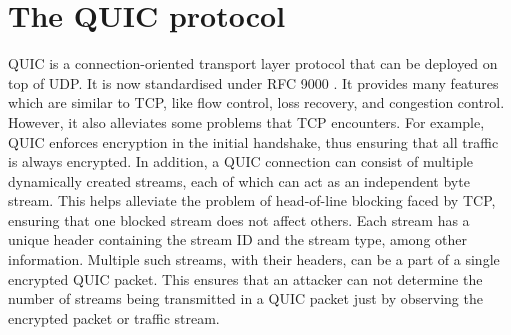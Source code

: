 \section{The QUIC protocol}
\label{sec:quic-bg}

QUIC is a connection-oriented transport layer protocol that can be deployed on top of UDP.
It is now standardised under RFC 9000 \cite{quic_rfc}.
It provides many features which are similar to TCP, like flow control, loss recovery, and congestion control. 
However, it also alleviates some problems that TCP encounters.
For example, QUIC enforces encryption in the initial handshake, thus ensuring that all traffic is always encrypted.
In addition, a QUIC connection can consist of multiple dynamically created streams, each of which can act as an independent byte stream. 
This helps alleviate the problem of head-of-line blocking faced by TCP, ensuring that one blocked stream does not affect others.
Each stream has a unique header containing the stream ID and the stream type, among other information.
Multiple such streams, with their headers, can be a part of a single encrypted QUIC packet.
This ensures that an attacker can not determine the number of streams being transmitted in a QUIC packet just by observing the encrypted packet or traffic stream.


\endinput

\footnote{While QUIC has a PADDING frame, we don't use it, as a packet that only contains padding frames will not be re-transmitted in case of packet loss, thus revealing that it was a dummy packet.}

